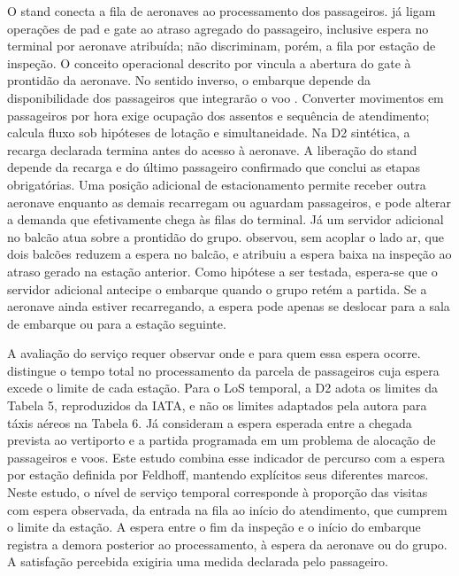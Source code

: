 O stand conecta a fila de aeronaves ao processamento dos passageiros. \citet{preisHornung2022} já ligam operações de pad e gate ao atraso agregado do passageiro, inclusive espera no terminal por aeronave atribuída; não discriminam, porém, a fila por estação de inspeção. O conceito operacional descrito por \citet{kunchulia2021} vincula a abertura do gate à prontidão da aeronave. No sentido inverso, o embarque depende da disponibilidade dos passageiros que integrarão o voo \citep{saxena2025vertiminal}. Converter movimentos em passageiros por hora exige ocupação dos assentos e sequência de atendimento; \citet{preis2023} calcula fluxo sob hipóteses de lotação e simultaneidade. Na D2 sintética, a recarga declarada termina antes do acesso à aeronave. A liberação do stand depende da recarga e do último passageiro confirmado que conclui as etapas obrigatórias. Uma posição adicional de estacionamento permite receber outra aeronave enquanto as demais recarregam ou aguardam passageiros, e pode alterar a demanda que efetivamente chega às filas do terminal. Já um servidor adicional no balcão atua sobre a prontidão do grupo. \citet{feldhoff2022} observou, sem acoplar o lado ar, que dois balcões reduzem a espera no balcão, e atribuiu a espera baixa na inspeção ao atraso gerado na estação anterior. Como hipótese a ser testada, espera-se que o servidor adicional antecipe o embarque quando o grupo retém a partida. Se a aeronave ainda estiver recarregando, a espera pode apenas se deslocar para a sala de embarque ou para a estação seguinte.

A avaliação do serviço requer observar onde e para quem essa espera ocorre. \citet{feldhoff2022} distingue o tempo total no processamento da parcela de passageiros cuja espera excede o limite de cada estação. Para o LoS temporal, a D2 adota os limites da Tabela 5, reproduzidos da IATA, e não os limites adaptados pela autora para táxis aéreos na Tabela 6. Já \citet{bennaceur2022} consideram a espera esperada entre a chegada prevista ao vertiporto e a partida programada em um problema de alocação de passageiros e voos. Este estudo combina esse indicador de percurso com a espera por estação definida por Feldhoff, mantendo explícitos seus diferentes marcos. Neste estudo, o nível de serviço temporal corresponde à proporção das visitas com espera observada, da entrada na fila ao início do atendimento, que cumprem o limite da estação. A espera entre o fim da inspeção e o início do embarque registra a demora posterior ao processamento, à espera da aeronave ou do grupo. A satisfação percebida exigiria uma medida declarada pelo passageiro.

